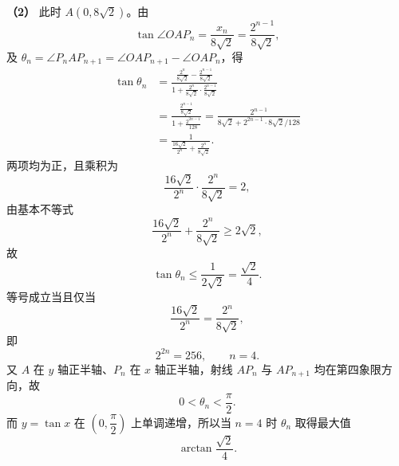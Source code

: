 \begin{answer}
\textbf{（2）} 此时 $A(0,8\sqrt2)$。由
\nopagebreak[4]
\[\tan\angle OAP_n=\frac{x_n}{8\sqrt2}=\frac{2^{n-1}}{8\sqrt2},\]
及 $\theta_n=\angle P_nAP_{n+1}=\angle OAP_{n+1}-\angle OAP_n$，得
\nopagebreak[4]
\[\begin{aligned}
\tan\theta_n
&=\frac{\frac{2^n}{8\sqrt2}-\frac{2^{n-1}}{8\sqrt2}}
{1+\frac{2^n}{8\sqrt2}\cdot\frac{2^{n-1}}{8\sqrt2}}\\
&=\frac{\frac{2^{n-1}}{8\sqrt2}}{1+\frac{2^{2n-1}}{128}}
=\frac{2^{n-1}}{8\sqrt2+2^{2n-1}\cdot8\sqrt2/128}\\
&=\frac{1}{\frac{16\sqrt2}{2^n}+\frac{2^n}{8\sqrt2}}.
\end{aligned}\]
两项均为正，且乘积为
\nopagebreak[4]
\[\frac{16\sqrt2}{2^n}\cdot\frac{2^n}{8\sqrt2}=2,\]
由基本不等式
\nopagebreak[4]
\[\frac{16\sqrt2}{2^n}+\frac{2^n}{8\sqrt2}\geqslant2\sqrt2,\]
故
\nopagebreak[4]
\[\tan\theta_n\leqslant\frac{1}{2\sqrt2}=\frac{\sqrt2}{4}.\]
等号成立当且仅当
\nopagebreak[4]
\[\frac{16\sqrt2}{2^n}=\frac{2^n}{8\sqrt2},\]
即
\nopagebreak[4]
\[2^{2n}=256,\qquad n=4.\]
又 $A$ 在 $y$ 轴正半轴、$P_n$ 在 $x$ 轴正半轴，射线 $AP_n$ 与 $AP_{n+1}$ 均在第四象限方向，故
\nopagebreak[4]
\[0<\theta_n<\frac\pi2.\]
而 $y=\tan x$ 在 $\left(0,\dfrac\pi2\right)$ 上单调递增，所以当 $n=4$ 时 $\theta_n$ 取得最大值
\nopagebreak[4]
\[\arctan\frac{\sqrt2}{4}.\]



\end{answer}
